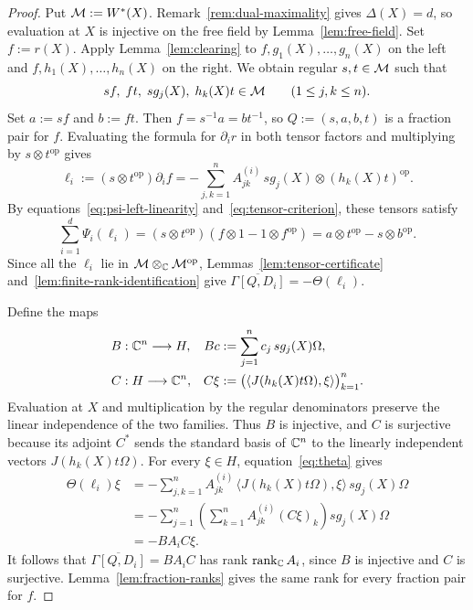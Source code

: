 \begin{proof}
Put $\mathcal M:=W^*(X)$.
Remark~\ref{rem:dual-maximality} gives $\Delta(X)=d$, so evaluation at $X$ is injective on the free field by Lemma~\ref{lem:free-field}.
Set $f:=r(X)$.
Apply Lemma~\ref{lem:clearing} to $f,g_1(X),\ldots,g_n(X)$ on the left and $f,h_1(X),\ldots,h_n(X)$ on the right.
We obtain regular $s,t\in\mathcal M$ such that
\[
 sf,\;ft,\;sg_j(X),\;h_k(X)t\in\mathcal M
 \qquad(1\leq j,k\leq n).
\]
Set $a:=sf$ and $b:=ft$.
Then $f=s^{-1}a=bt^{-1}$, so $Q:=(s,a,b,t)$ is a fraction pair for $f$.
Evaluating the formula for $\partial_i r$ in both tensor factors and multiplying by $s\otimes t^{\mathrm{op}}$ gives
\[
 \ell_i:=(s\otimes t^{\mathrm{op}})\partial_i f
 =-\sum_{j,k=1}^n A_{jk}^{(i)}\,sg_j(X)\otimes(h_k(X)t)^{\mathrm{op}}.
\]
By equations~\eqref{eq:psi-left-linearity} and~\eqref{eq:tensor-criterion}, these tensors satisfy
\[
 \sum_{i=1}^d\Psi_i(\ell_i)
 =(s\otimes t^{\mathrm{op}})(f\otimes1-1\otimes f^{\mathrm{op}})
 =a\otimes t^{\mathrm{op}}-s\otimes b^{\mathrm{op}}.
\]
Since all the $\ell_i$ lie in $\mathcal M\otimes_{\mathbb C}\mathcal M^{\mathrm{op}}$, Lemmas~\ref{lem:tensor-certificate} and~\ref{lem:finite-rank-identification} give $\overline{\Gamma[Q,D_i]}=-\Theta(\ell_i)$.

Define the maps
\[
 \begin{aligned}
 B&:\mathbb C^n\longrightarrow H, & Bc&:=\sum_{j=1}^n c_j\,sg_j(X)\Omega,\\
 C&:H\longrightarrow\mathbb C^n, & C\xi&:=\bigl(\langle J(h_k(X)t\Omega),\xi\rangle\bigr)_{k=1}^n .
 \end{aligned}
\]
Evaluation at $X$ and multiplication by the regular denominators preserve the linear independence of the two families.
Thus $B$ is injective, and $C$ is surjective because its adjoint $C^*$ sends the standard basis of $\mathbb C^n$ to the linearly independent vectors $J(h_k(X)t\Omega)$.
For every $\xi\in H$, equation~\eqref{eq:theta} gives
\begin{align*}
 \Theta(\ell_i)\xi
 &=-\sum_{j,k=1}^n A_{jk}^{(i)}\,
   \langle J(h_k(X)t\Omega),\xi\rangle\,sg_j(X)\Omega\\
 &=-\sum_{j=1}^n
   \left(\sum_{k=1}^n A_{jk}^{(i)}(C\xi)_k\right)sg_j(X)\Omega\\
 &=-BA_iC\xi.
\end{align*}
It follows that $\overline{\Gamma[Q,D_i]}=BA_iC$ has rank $\operatorname{rank}_{\mathbb C}A_i$, since $B$ is injective and $C$ is surjective.
Lemma~\ref{lem:fraction-ranks} gives the same rank for every fraction pair for $f$.
\end{proof}

